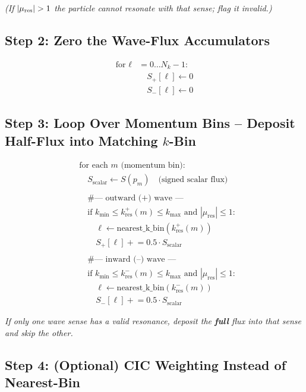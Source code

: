 \textit{(If $\lvert \mu_{\rm res} \rvert > 1$ the particle cannot resonate with that sense; flag it invalid.)}

\subsection*{Step 2: Zero the Wave-Flux Accumulators}

\[
\begin{aligned}
\text{for } \ell &= 0 \dots N_k{-}1: \\
&\quad S_{+}[\ell] \leftarrow 0 \\
&\quad S_{-}[\ell] \leftarrow 0
\end{aligned}
\]


\subsection*{Step 3: Loop Over Momentum Bins – Deposit Half-Flux into Matching $k$-Bin}

\[
\begin{aligned}
&\text{for each } m \text{ (momentum bin):} \\
&\quad S_{\text{scalar}} \leftarrow S(p_m) \quad \text{(signed scalar flux)} \\
\\
&\quad \text{\# --- outward (+) wave ---} \\
&\quad \text{if } k_{\min} \leq k^{+}_{\text{res}}(m) \leq k_{\max} \text{ and } |\mu_{\text{res}}| \leq 1: \\
&\qquad \ell \leftarrow \text{nearest\_k\_bin}(k^{+}_{\text{res}}(m)) \\
&\qquad S_{+}[\ell] \mathrel{+}= 0.5 \cdot S_{\text{scalar}} \\
\\
&\quad \text{\# --- inward (–) wave ---} \\
&\quad \text{if } k_{\min} \leq k^{-}_{\text{res}}(m) \leq k_{\max} \text{ and } |\mu_{\text{res}}| \leq 1: \\
&\qquad \ell \leftarrow \text{nearest\_k\_bin}(k^{-}_{\text{res}}(m)) \\
&\qquad S_{-}[\ell] \mathrel{+}= 0.5 \cdot S_{\text{scalar}}
\end{aligned}
\]


\textit{If only one wave sense has a valid resonance, deposit the \textbf{full} flux into that sense and skip the other.}

\subsection*{Step 4: (Optional) CIC Weighting Instead of Nearest-Bin}

